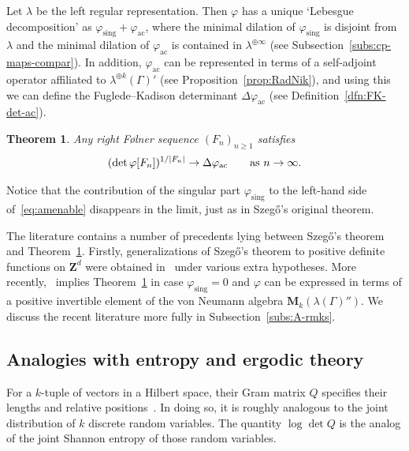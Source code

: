 \documentclass[12pt,a4paper]{article}
\numberwithin{equation}{section}
\newtheorem{mainthm}{Theorem}
\theoremstyle{remark}
\renewcommand{\rm}[1]{\mathrm{#1}}
\newcommand{\bbZ}{\mathbf{Z}}
\newcommand{\rmM}{\mathbf{M}}
\newcommand{\G}{\Gamma}
\renewcommand{\phi}{\varphi}
\renewcommand{\l}{\lambda}
\begin{document}
Let $\l$ be the left regular representation.  Then $\phi$ has a unique `Lebesgue decomposition' as $\phi_{\rm{sing}} + \phi_{\rm{ac}}$, where the minimal dilation of $\phi_{\rm{sing}}$ is disjoint from $\l$ and the minimal dilation of $\phi_{\rm{ac}}$ is contained in $\l^{\oplus \infty}$ (see Subsection~\ref{subs:cp-maps-compar}).  In addition, $\phi_{\rm{ac}}$ can be represented in terms of a self-adjoint operator affiliated to $\l^{\oplus k}(\G)'$ (see Proposition~\ref{prop:RadNik}), and using this we can define the Fuglede--Kadison determinant $\Delta \phi_{\rm{ac}}$ (see Definition~\ref{dfn:FK-det-ac}).

\begin{mainthm}\label{mainthm:amenable}
Any right F\o lner sequence $(F_n)_{n\ge 1}$ satisfies
\begin{equation}\label{eq:amenable}
(\det \phi[F_n])^{1/|F_n|} \to \Delta \phi_{\rm{ac}}\qquad \hbox{as}\ n\to\infty.
\end{equation}
\end{mainthm}

Notice that the contribution of the singular part $\phi_{\rm{sing}}$ to the left-hand side of~\eqref{eq:amenable} disappears in the limit, just as in Szeg\H{o}'s original theorem.

The literature contains a number of precedents lying between Szeg\H{o}'s theorem and Theorem~\ref{mainthm:amenable}.  Firstly, generalizations of Szeg\H{o}'s theorem to positive definite functions on $\bbZ^d$ were obtained in~\cite{HelLow58,Linnik75,Dok84} under various extra hypotheses.  More recently,~\cite[Thm. 3.2]{Den06} implies Theorem~\ref{mainthm:amenable} in case $\phi_{\rm{sing}} = 0$ and $\phi$ can be expressed in terms of a positive invertible element of the von Neumann algebra $\rmM_k(\l(\G)'')$.  We discuss the recent literature more fully in Subsection~\ref{subs:A-rmks}.  

\subsection{Analogies with entropy and ergodic theory}\label{subs:analogies}

For a $k$-tuple of vectors in a Hilbert space, their Gram matrix $Q$ specifies their lengths and relative positions~\cite[Sec. 7.2]{HorJohMA}.  In doing so, it is roughly analogous to the joint distribution of $k$ discrete random variables.  The quantity $\log \det Q$ is the analog of the joint Shannon entropy of those random variables.
\end{document}
